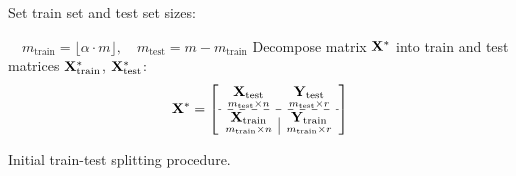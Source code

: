 \documentclass[conference]{IEEEtran}
\begin{document}
\begin{algorithm}[!h]
{}
 Set train set and test set sizes:

 $ \quad m_{\text{train}} = \lfloor\alpha\cdot m\rfloor, \quad m_{\text{test}} = m - m_{\text{train}} $ \; %
 Decompose matrix ${\mathbf{X}}^{*}$ into train and test matrices ${\mathbf{X}}^{*}_{\text{train}}$, ${\mathbf{X}}^{*}_{\text{test}}$:
 \[\bX^{*} = \left[\begin{array}{c|c}
 \underset{m_{\text{test}}{\times}n}{\bX_{\text{test}}} & \underset{m_{\text{test}}{\times}r}{\bY_{\text{test}}}  \\
 \hdashline
 \underset{m_{\text{train}}{\times}n}{\bX_{\text{train}}}  & \underset{m_{\text{train}}{\times}r}{\bY_{\text{train}}}
 \end{array}\right]
 \]
  \caption{Initial train-test splitting procedure.}\label{alg:train_test}
\end{algorithm}
\end{document}
